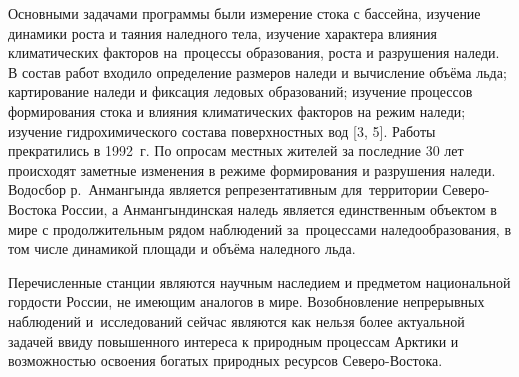 Основными задачами программы были измерение стока с бассейна, изучение динамики роста и таяния наледного тела, изучение характера влияния климатических факторов на~процессы образования, роста и разрушения наледи. В состав работ входило определение размеров наледи и вычисление объёма льда; картирование наледи и фиксация ледовых образований; изучение процессов формирования стока и влияния климатических факторов на режим наледи; изучение гидрохимического состава поверхностных вод [3, 5].
\clearpage
Работы прекратились в 1992~г. По опросам местных жителей за последние 30 лет происходят заметные изменения в режиме формирования и разрушения наледи. Водосбор р.~Анмангында является репрезентативным для~территории Северо-Востока России, а Анмангындинская наледь является единственным объектом в мире с продолжительным рядом наблюдений за~процессами наледообразования, в том числе динамикой площади и объёма наледного льда.

Перечисленные станции являются научным наследием и предметом национальной гордости России, не имеющим аналогов в мире. Возобновление непрерывных наблюдений и~исследований сейчас являются как нельзя более актуальной задачей ввиду повышенного интереса к природным процессам Арктики и возможностью освоения богатых природных ресурсов Северо-Востока.

